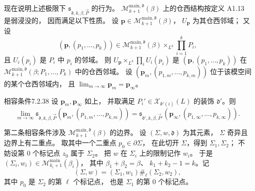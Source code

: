 现在说明上述极限下
$\mathfrak s_{\mathfrak d,k,\beta,\vec P}$ 的行为。
$\mathcal M^{\mathrm{main},\mathfrak d}_{k+1}(\beta)$
上的仓西结构按定义 A1.13 是弱浸没的，
因而满足以下性质。
设 $\mathbf p\in
\mathcal M^{\mathrm{main},\mathfrak d}_{k+1}(\beta)$，
$U_{\mathbf p}$ 为其仓西邻域；
又设
\[
(\mathbf p,(p_1,\ldots,p_k))
\in\mathcal M^{\mathrm{main},\mathfrak d}_{k+1}(\beta)
\mathop{\times}_{L^k}\prod_{i=1}^{k}P_i,
\]
且 $U_i(p_i)$ 是 $P_i$ 中 $p_i$ 的邻域。
则
$U_{\mathbf p}\mathop{\times}_{L^k}
\prod_iU_i(p_i)$
是 $(\mathbf p,(p_1,\ldots,p_k))$ 在
$\mathcal M^{\mathrm{main},\mathfrak d}_{k+1}
(\beta;P_1,\ldots,P_k)$ 中的仓西邻域。
设
$(\mathbf p_m,(p_{1,m},\ldots,p_{k,m}))$
位于该模空间的某个仓西邻域内，
且 $\lim_{m\to\infty}\mathbf p_m=\mathbf p_\infty$。

\begin{statement}{相容条件}{7.2.38}\label{cond:7-2-38}
%
设 $\mathbf p_m,\mathbf p_\infty$ 如上，
并取满足
$P_i'\in\mathcal X_{\mathfrak d'(i)}(L)$
的装饰 $\mathfrak d'$。则
\[
\lim_{m\to\infty}
\mathfrak s_{\mathfrak d,k,\beta,\vec P}
(\mathbf p_m,(p_{1,m},\ldots,p_{k,m}))
=\mathfrak s_{\mathfrak d',k,\beta,\vec P'}
(\mathbf p_\infty,(p_{1,\infty},\ldots,p_{k,\infty})).
\]
\end{statement}

第二条相容条件涉及
$\mathcal M^{\mathrm{main},\mathfrak d}_{k+1}(\beta)$
的边界。
设 $(\Sigma,w,\mathfrak d)$ 为其元素，
$\Sigma$ 奇异且边界上有二重点。
取其中一个二重点 $p_0\in\partial\Sigma$，
在此切开 $\Sigma$，得到 $\Sigma_1,\Sigma_2$；
不妨设第 $0$ 个标记点 $z_0$ 属于 $\Sigma_2$。
把 $w$ 在 $\Sigma_i$ 上的限制记作 $w_i$。
于是
$(\Sigma_i,w_i)\in
\mathcal M^{\mathrm{main}}_{k_i+1}(\beta_i)$，
其中 $\beta_1+\beta_2=\beta$、
$k_1+k_2-1=k$。记
\begin{equation}
(\Sigma,w)
=(\Sigma_1,w_1)\mathbin{\#_\ell}(\Sigma_2,w_2),
\tag{7.2.39}\label{eq:7-2-39}
\end{equation}
其中 $p_0$ 是 $\Sigma_2$ 的第 $\ell$ 个标记点，
也是 $\Sigma_1$ 的第 $0$ 个标记点。

